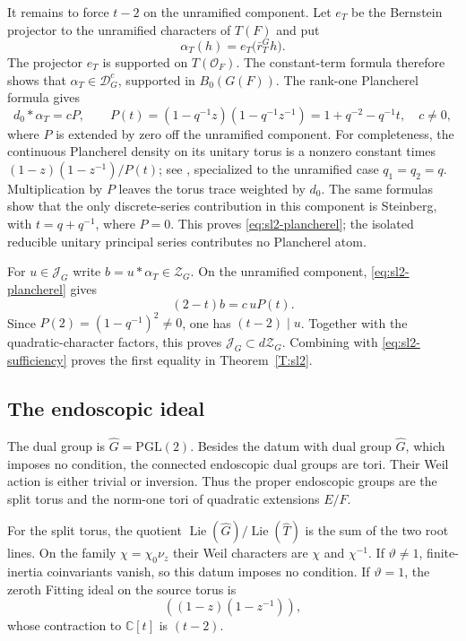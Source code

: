 \documentclass[11pt,a4paper]{amsart}
\DeclareMathOperator{\Lie}{Lie}
\newcommand{\mcD}{\mathcal D}
\newcommand{\mcZ}{\mathcal Z}
\newcommand{\mcJ}{\mathcal J}
\theoremstyle{definition}
\theoremstyle{remark}
\begin{document}
It remains to force $t-2$ on the unramified component. Let $e_T$ be
the Bernstein projector to the unramified characters of $T(F)$ and
put
$$
 \alpha_T(h)=e_T\bigl(\bar r_T^G h\bigr).
$$
The projector $e_T$ is supported on $T(\mathcal O_F)$.
The constant-term formula therefore shows that
$\alpha_T\in\mcD_G^c$, supported in $B_0(G(F))$.
The rank-one Plancherel formula gives
\begin{equation}\label{eq:sl2-plancherel}
 d_0*\alpha_T=cP,\qquad
 P(t)=(1-q^{-1}z)(1-q^{-1}z^{-1})
      =1+q^{-2}-q^{-1}t,
 \quad c\ne0,
\end{equation}
where $P$ is extended by zero off the unramified component.
For completeness, the continuous Plancherel density on its unitary
torus is a nonzero constant times
$(1-z)(1-z^{-1})/P(t)$; see
\cite[Proposition 3.12, Theorems 3.14 and 4.5(2)(iii), and Sections 4.7--4.8]{KM},
specialized to the unramified case $q_1=q_2=q$.
Multiplication by $P$ leaves the torus trace weighted by $d_0$.
The same formulas show that the only discrete-series contribution
in this component is Steinberg, with $t=q+q^{-1}$, where $P=0$.
This proves \eqref{eq:sl2-plancherel}; the isolated reducible unitary
principal series contributes no Plancherel atom.

For $u\in\mcJ_G$ write $b=u*\alpha_T\in\mcZ_G$. On the
unramified component, \eqref{eq:sl2-plancherel} gives
$$
 (2-t)b=c\,uP(t).
$$
Since $P(2)=(1-q^{-1})^2\ne0$, one has $(t-2)\mid u$.
Together with the quadratic-character factors, this proves
$\mcJ_G\subset d\mcZ_G$. Combining with
\eqref{eq:sl2-sufficiency} proves the first equality in
Theorem~\ref{T:sl2}.

\subsection{The endoscopic ideal}
The dual group is $\widehat G=\mathrm{PGL}(2)$.
Besides the datum with dual group $\widehat G$, which imposes no
condition, the connected endoscopic dual groups are tori.
Their Weil action is either trivial or inversion. Thus the proper
endoscopic groups are the split torus and the norm-one tori of
quadratic extensions $E/F$.

For the split torus, the quotient
$\Lie(\widehat G)/\Lie(\widehat T)$ is the sum of the two root
lines. On the family $\chi=\chi_0\nu_z$ their Weil characters are
$\chi$ and $\chi^{-1}$. If $\vartheta\ne1$, finite-inertia
coinvariants vanish, so this datum imposes no condition. If
$\vartheta=1$, the zeroth Fitting ideal on the source torus is
$$
 ((1-z)(1-z^{-1})),
$$
whose contraction to $\mathbb C[t]$ is $(t-2)$.
\end{document}
